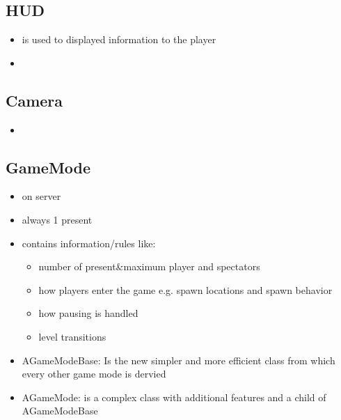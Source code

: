 \documentclass{scrbook}
\begin{document}
            \subsection{HUD}
                \begin{itemize}
                    \item is used to displayed information to the player 
                    \item 
                \end{itemize}
            \subsection{Camera}
                \begin{itemize}
                    \item 
                \end{itemize}
            \subsection{GameMode}
                \begin{itemize}
                    \item on server
                    \item always 1 present
                    \item contains information/rules like:
                    \begin{itemize}
                        \item number of present\&maximum player and spectators
                        \item how players enter the game e.g. spawn locations and spawn behavior
                        \item how pausing is handled
                        \item level transitions
                    \end{itemize}
                    \item AGameModeBase: Is the new simpler and more efficient class from which every other game mode is dervied
                    \item AGameMode: is a complex class with additional features and a child of AGameModeBase
                \end{itemize}
                
\end{document}
